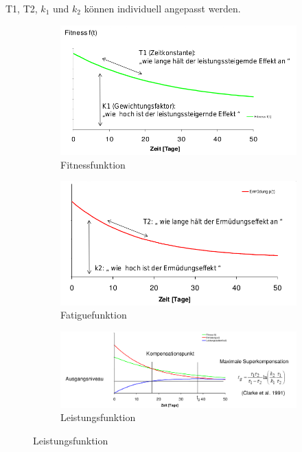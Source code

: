 T1, T2, $k_1$ und $k_2$ können individuell angepasst werden.
\begin{figure}[H]
  \centering
  \begin{subfigure}{.45\textwidth}
    \includegraphics[width=\textwidth]{pictures/trainingssteuerung_fitnessfunktion.png}
    \caption{Fitnessfunktion}
  \end{subfigure}
  \begin{subfigure}{.45\textwidth}
    \includegraphics[width=\textwidth]{pictures/trainingssteuerung_fatiguefunktion.png}
    \caption{Fatiguefunktion}
  \end{subfigure}
  \begin{subfigure}{\textwidth}
    \includegraphics[width=\textwidth]{pictures/trainingssteuerung_leistungsfunktion.png}
    \caption{Leistungsfunktion}
  \end{subfigure}
\end{figure}
